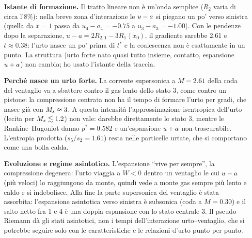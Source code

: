 \textbf{Istante di formazione.} Il tratto lineare non è un'onda semplice ($R_2$ varia di circa l'8\%): nella breve
zona d'interazione le $u-a$ si piegano un po' verso sinistra (quella da $x=1$ passa da $u_4-a_4=-\num{0.75}$ a
$u_3-a_3=-\num{1.00}$). Con le pendenze dopo la separazione, $u-a=2R_{2,1}-3R_1(x_0)$, il gradiente sarebbe
\num{2.61} e $t\approx\num{0.38}$: l'urto nasce un po' prima di $t^*$ e la coalescenza non è esattamente in un
punto. La struttura (urto forte nato quasi tutto insieme, contatto, espansione $u+a$) non cambia; ho usato
l'istante della traccia.

\textbf{Perché nasce un urto forte.} La corrente supersonica a $M=\num{2.61}$ della coda del ventaglio va a
sbattere contro il gas lento dello stato 3, come contro un pistone: la compressione centrata non ha il tempo di
formare l'urto per gradi, che nasce già con $M_{s}\approx3$. A questa intensità l'approssimazione isentropica
dell'urto (lecita per $M_{s}\lesssim\num{1.2}$) non vale: darebbe direttamente lo stato 3, mentre le
Rankine--Hugoniot danno $p^*=\num{0.582}$ e un'espansione $u+a$ non trascurabile. L'entropia prodotta
($s_5/s_2=\num{1.61}$) resta nelle particelle urtate, che si comportano come una bolla calda.

\textbf{Evoluzione e regime asintotico.} L'espansione ``vive per sempre'', la compressione degenera: l'urto viaggia
a $W<0$ dentro un ventaglio le cui $u-a$ (più veloci) lo raggiungono da monte, quindi vede a monte gas sempre più
lento e caldo e si indebolisce. Alla fine la parte supersonica del ventaglio è stata assorbita: l'espansione
asintotica verso sinistra è subsonica (coda a $M=\num{0.30}$) e il salto netto fra 1 e 4 è una doppia espansione
con lo stato centrale 3. Il pseudo-Riemann dà gli stati asintotici, non i tempi dell'interazione urto--ventaglio,
che si potrebbe seguire solo con le caratteristiche e le relazioni d'urto punto per punto.

